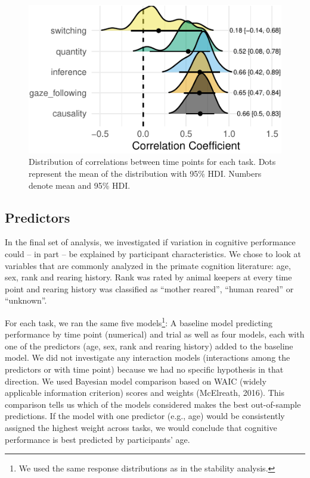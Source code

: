 \documentclass[10pt, letterpaper]{article}
\newenvironment{CodeChunk}{}{}
\begin{document}
\begin{CodeChunk}
\begin{figure}[H]

{\centering \includegraphics{figs/relplot-1} 

}

\caption[Distribution of correlations between time points for each task]{Distribution of correlations between time points for each task. Dots represent the mean of the distribution with 95\% HDI. Numbers denote mean and 95\% HDI.}\label{fig:relplot}
\end{figure}
\end{CodeChunk}

\hypertarget{predictors}{%
\subsection{Predictors}\label{predictors}}

In the final set of analysis, we investigated if variation in cognitive
performance could -- in part -- be explained by participant
characteristics. We chose to look at variables that are commonly
analyzed in the primate cognition literature: age, sex, rank and rearing
history. Rank was rated by animal keepers at every time point and
rearing history was classified as ``mother reared'', ``human reared'' or
``unknown''.

For each task, we ran the same five models\footnote{We used the same
  response distributions as in the stability analysis.}: A baseline
model predicting performance by time point (numerical) and trial as well
as four models, each with one of the predictors (age, sex, rank and
rearing history) added to the baseline model. We did not investigate any
interaction models (interactions among the predictors or with time
point) because we had no specific hypothesis in that direction. We used
Bayesian model comparison based on WAIC (widely applicable information
criterion) scores and weights (McElreath, 2016). This comparison tells
us which of the models considered makes the best out-of-sample
predictions. If the model with one predictor (e.g., age) would be
consistently assigned the highest weight across tasks, we would conclude
that cognitive performance is best predicted by participants' age.
\end{document}
